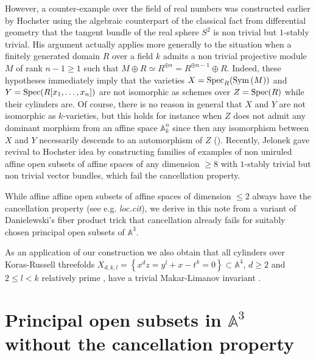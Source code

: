 \documentclass[10pt,oneside,english]{amsart}
\numberwithin{equation}{section}
\numberwithin{figure}{section}
\theoremstyle{plain}
\theoremstyle{remark}
\theoremstyle{plain}
\theoremstyle{plain}
\theoremstyle{definition}
\begin{document}
However, a counter-example over the field of real numbers was constructed
earlier by Hochster \cite{Hochster1972} using the algebraic counterpart
of the classical fact from differential geometry that the tangent
bundle of the real sphere $S^{2}$ is non trivial but $1$-stably
trivial. His argument actually applies more generally to the situation
when a finitely generated domain $R$ over a field $k$ admits a non
trivial projective module $M$ of rank $n-1\geq1$ such that $M\oplus R\simeq R^{\oplus n}=R^{\oplus n-1}\oplus R$.
Indeed, these hypotheses immediately imply that the varieties $X={\rm Spec}_{R}({\rm Sym}\left(M\right))$
and $Y={\rm Spec}(R[x_{1},\ldots,x_{n}])$ are not isomorphic as schemes
over $Z={\rm Spec}(R)$ while their cylinders are. Of course, there
is no reason in general that $X$ and $Y$ are not isomorphic as $k$-varieties,
but this holds for instance when $Z$ does not admit any dominant
morphism from an affine space $\mathbb{A}_{k}^{n}$ since then any
isomorphism between $X$ and $Y$ necessarily descends to an automorphism
of $Z$ (\cite{Iitaka1977a,Drylo2007}). Recently, Jelonek \cite{Jelonek2009}
gave revival to Hochster idea by constructing families of examples
of non uniruled affine open subsets of affine spaces of any dimension
$\geq8$ with $1$-stably trivial but non trivial vector bundles,
which fail the cancellation property. 

While affine affine open subsets of affine spaces of dimension $\leq2$
always have the cancellation property (see e.g. \emph{loc.cit}), we
derive in this note from a variant of Danielewski's fiber product
trick that cancellation already fails for suitably chosen principal
open subsets of $\mathbb{A}^{3}$. 

As an application of our construction we also obtain that all cylinders
over Koras-Russell threefolds $X_{d,k,l}=\left\{ x^{d}z=y^{l}+x-t^{k}=0\right\} \subset\mathbb{A}^{4}$,
$d\geq2$ and $2\leq l<k$ relatively prime \cite{Kaliman1997}, have
a trivial Makar-Limanov invariant \cite{Makar-Limanov1996}. 


\section{Principal open subsets in $\mathbb{A}^{3}$ without the cancellation
property }
\end{document}

